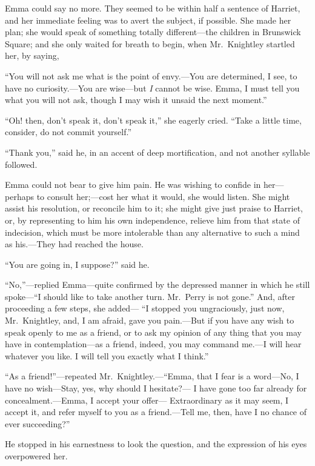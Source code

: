 Emma could say no more.  They seemed to be within half a sentence
of Harriet, and her immediate feeling was to avert the subject,
if possible.  She made her plan; she would speak of something
totally different---the children in Brunswick Square; and she
only waited for breath to begin, when Mr.\ Knightley startled her,
by saying,

``You will not ask me what is the point of envy.---You are determined,
I see, to have no curiosity.---You are wise---but \emph{I} cannot be wise.
Emma, I must tell you what you will not ask, though I may wish it
unsaid the next moment.''

``Oh! then, don't speak it, don't speak it,'' she eagerly cried.
``Take a little time, consider, do not commit yourself.''

``Thank you,'' said he, in an accent of deep mortification, and not
another syllable followed.

Emma could not bear to give him pain.  He was wishing to confide in her---%
perhaps to consult her;---cost her what it would, she would listen.
She might assist his resolution, or reconcile him to it;
she might give just praise to Harriet, or, by representing to him
his own independence, relieve him from that state of indecision,
which must be more intolerable than any alternative to such a mind
as his.---They had reached the house.

``You are going in, I suppose?'' said he.

``No,''---replied Emma---quite confirmed by the depressed manner
in which he still spoke---``I should like to take another turn.
Mr.\ Perry is not gone.''  And, after proceeding a few steps, she added---%
``I stopped you ungraciously, just now, Mr.\ Knightley, and, I am afraid,
gave you pain.---But if you have any wish to speak openly to me
as a friend, or to ask my opinion of any thing that you may have
in contemplation---as a friend, indeed, you may command me.---I will
hear whatever you like.  I will tell you exactly what I think.''

``As a friend!''---repeated Mr.\ Knightley.---``Emma, that I fear is
a word---No, I have no wish---Stay, yes, why should I hesitate?---%
I have gone too far already for concealment.---Emma, I accept your offer---%
Extraordinary as it may seem, I accept it, and refer myself to you
as a friend.---Tell me, then, have I no chance of ever succeeding?''

He stopped in his earnestness to look the question, and the expression
of his eyes overpowered her.

